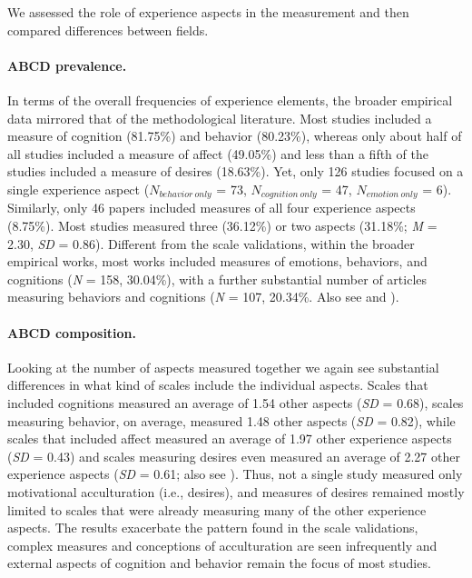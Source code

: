 We assessed the role of experience aspects in the measurement and then
compared differences between fields.

\paragraph{ABCD prevalence.}

In terms of the overall frequencies of experience elements, the broader
empirical data mirrored that of the methodological literature. Most
studies included a measure of cognition (81.75\%) and behavior
(80.23\%), whereas only about half of all studies included a measure of
affect (49.05\%) and less than a fifth of the studies included a measure
of desires (18.63\%). Yet, only 126 studies focused on a single
experience aspect (\(N_{behavior\ only}\) = 73, \(N_{cognition\ only}\)
= 47, \(N_{emotion\ only}\) = 6). Similarly, only 46 papers included
measures of all four experience aspects (8.75\%). Most studies measured
three (36.12\%) or two aspects (31.18\%; \textit{M} = 2.30, \textit{SD}
= 0.86). Different from the scale validations, within the broader
empirical works, most works included measures of emotions, behaviors,
and cognitions (\textit{N} = 158, 30.04\%), with a further substantial
number of articles measuring behaviors and cognitions (\textit{N} = 107,
20.34\%. Also see  and
).

\paragraph{ABCD composition.}

Looking at the number of aspects measured together we again see
substantial differences in what kind of scales include the individual
aspects. Scales that included cognitions measured an average of 1.54
other aspects (\textit{SD} = 0.68), scales measuring behavior, on
average, measured 1.48 other aspects (\textit{SD} = 0.82), while scales
that included affect measured an average of 1.97 other experience
aspects (\textit{SD} = 0.43) and scales measuring desires even measured
an average of 2.27 other experience aspects (\textit{SD} = 0.61; also
see ). Thus, not a single study
measured only motivational acculturation (i.e., desires), and measures
of desires remained mostly limited to scales that were already measuring
many of the other experience aspects. The results exacerbate the pattern
found in the scale validations, complex measures and conceptions of
acculturation are seen infrequently and external aspects of cognition
and behavior remain the focus of most studies.

